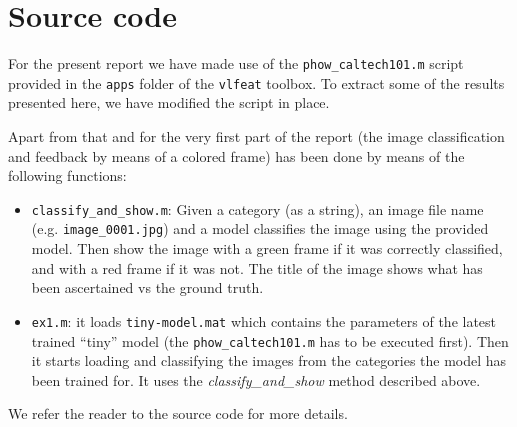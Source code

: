 \section{Source code}

For the present report we have made use of the \texttt{phow\_caltech101.m} script provided in the \texttt{apps} folder of the \texttt{vlfeat} toolbox. To extract some of the results presented here, we have modified the script in place.

Apart from that and for the very first part of the report (the image classification and feedback by means of a colored frame) has been done by means of the following functions:

\begin{itemize}
\item \texttt{classify\_and\_show.m}: Given a category (as a string), an image file name (e.g. \texttt{image\_0001.jpg}) and a model classifies the image using the provided model. Then show the image with a green frame if it was correctly classified, and with a red frame if it was not. The title of the image shows what has been ascertained vs the ground truth.
\item \texttt{ex1.m}: it loads \texttt{tiny-model.mat} which contains the parameters of the latest trained ``tiny'' model (the \texttt{phow\_caltech101.m} has to be executed first). Then it starts loading and classifying the images from the categories the model has been trained for. It uses the \emph{classify\_and\_show} method described above.
\end{itemize}

We refer the reader to the source code for more details.